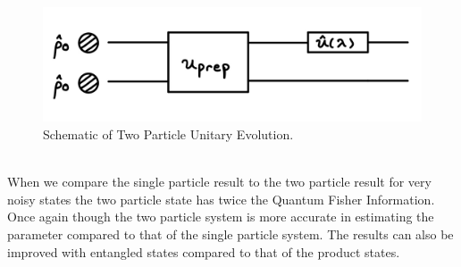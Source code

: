 \documentclass[twocolumn]{article}
\begin{document}
\begin{figure}[htpb]
\begin{center}
\includegraphics[width=0.90\linewidth]{Two-Particle-One-Unitary-QFI.jpg}
\caption{Schematic of Two Particle Unitary Evolution.}
\end{center}
\end{figure}\\
When we compare the single particle result to the two particle result for very noisy states the two particle state has twice the Quantum Fisher Information. Once again though the two particle system is more accurate in estimating the parameter compared to that of the single particle system. The results can also be improved with entangled states compared to that of the product states.
\end{document}
